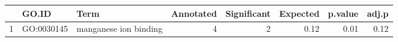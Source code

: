 \begin{table}[ht]
\centering
\begin{tabular}{rllrrrrr}
  \hline
 & GO.ID & Term & Annotated & Significant & Expected & p.value & adj.p \\ 
  \hline
1 & GO:0030145 & manganese ion binding &   4 &   2 & 0.12 & 0.01 & 0.12 \\ 
   \hline
\end{tabular}
\end{table}
